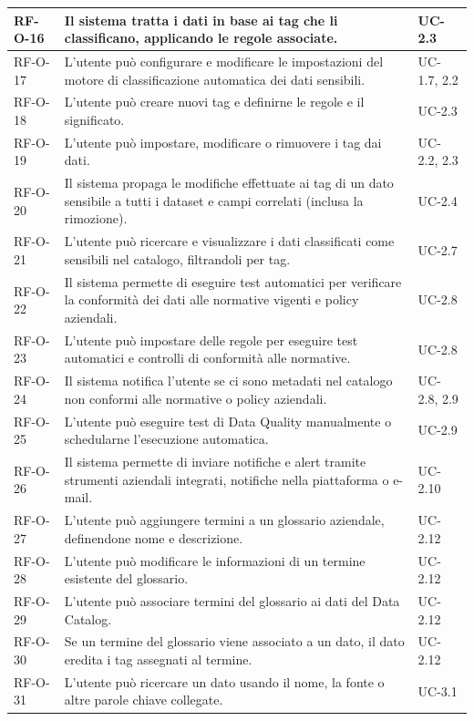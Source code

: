 \begin{longtable}{ p{} p{} p{} }
RF-O-16 & Il sistema tratta i dati in base ai tag che li classificano, applicando le regole associate. & UC-2.3 \\ \midrule
RF-O-17 & L'utente può configurare e modificare le impostazioni del motore di classificazione automatica dei dati sensibili. & UC-1.7, 2.2 \\ \midrule
RF-O-18 & L'utente può creare nuovi tag e definirne le regole e il significato. & UC-2.3 \\ \midrule
RF-O-19 & L'utente può impostare, modificare o rimuovere i tag dai dati. & UC-2.2, 2.3 \\ \midrule
RF-O-20 & Il sistema propaga le modifiche effettuate ai tag di un dato sensibile a tutti i dataset e campi correlati (inclusa la rimozione). & UC-2.4 \\ \midrule
RF-O-21 & L'utente può ricercare e visualizzare i dati classificati come sensibili nel catalogo, filtrandoli per tag. & UC-2.7 \\ \midrule
RF-O-22 & Il sistema permette di eseguire test automatici per verificare la conformità dei dati alle normative vigenti e policy aziendali. & UC-2.8 \\ \midrule
RF-O-23 & L'utente può impostare delle regole per eseguire test automatici e controlli di conformità alle normative. & UC-2.8 \\ \midrule
RF-O-24 & Il sistema notifica l'utente se ci sono metadati nel catalogo non conformi alle normative o policy aziendali. & UC-2.8, 2.9 \\ \midrule
RF-O-25 & L'utente può eseguire test di Data Quality manualmente o schedularne l'esecuzione automatica. & UC-2.9 \\ \midrule
RF-O-26 & Il sistema permette di inviare notifiche e alert tramite strumenti aziendali integrati, notifiche nella piattaforma o e-mail. & UC-2.10 \\ \midrule
RF-O-27 & L'utente può aggiungere termini a un glossario aziendale, definendone nome e descrizione. & UC-2.12 \\ \midrule
RF-O-28 & L'utente può modificare le informazioni di un termine esistente del glossario. & UC-2.12 \\ \midrule
RF-O-29 & L'utente può associare termini del glossario ai dati del Data Catalog. & UC-2.12 \\ \midrule
RF-O-30 & Se un termine del glossario viene associato a un dato, il dato eredita i tag assegnati al termine. & UC-2.12 \\ \midrule
RF-O-31 & L'utente può ricercare un dato usando il nome, la fonte o altre parole chiave collegate. & UC-3.1 \\ \midrule

\end{longtable}
